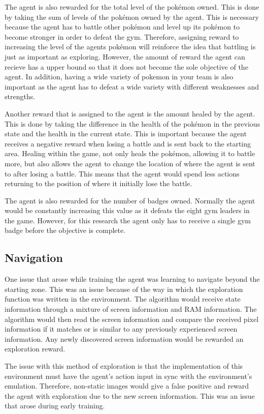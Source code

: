The agent is also rewarded for the total level of the pokémon owned. This is done by taking the sum of levels of the pokémon owned by the agent. This is necessary because the agent has to battle other pokémon and level up its pokémon to become stronger in order to defeat the gym. Therefore, assigning reward to increasing the level of the agents pokémon will reinforce the idea that battling is just as important as exploring. However, the amount of reward the agent can recieve has a upper bound so that it does not become the sole objective of the agent. In addition, having a wide variety of pokemon in your team is also important as the agent has to defeat a wide variety with different weaknesses and strengths. 

Another reward that is assigned to the agent is the amount healed by the agent. This is done by taking the difference in the health of the pokémon in the previous state and the health in the current state. This is important because the agent receives a negative reward when losing a battle and is sent back to the starting area. Healing within the game, not only heals the pokémon, allowing it to battle more, but also allows the agent to change the location of where the agent is sent to after losing a battle. This means that the agent would spend less actions returning to the position of where it initially lose the battle.

The agent is also rewarded for the number of badges owned. Normally the agent would be constantly increasing this value as it defeats the eight gym leaders in the game. However, for this research the agent only has to receive a single gym badge before the objective is complete.

\subsection{Navigation}

One issue that arose while training the agent was learning to navigate beyond the starting zone. This was an issue because of the way in which the exploration function was written in the environment. The algorithm would receive state information through a mixture of screen information and RAM information. The algorithm would then read the screen information and compare the received pixel information if it matches or is similar to any previously experienced screen information. Any newly discovered screen information would be rewarded an exploration reward. 

The issue with this method of exploration is that the implementation of this environment must have the agent's action input in sync with the environment's emulation. Therefore, non-static images would give a false positive and reward the agent with exploration due to the new screen information. This was an issue that arose during early training. 

